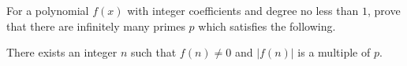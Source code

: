 For a polynomial $f(x)$ with integer coefficients and degree no less than $1$, prove that there are infinitely many primes $p$ which satisfies the following.

There exists an integer $n$ such that $f(n) \not= 0$ and $|f(n)|$ is a multiple of $p$.